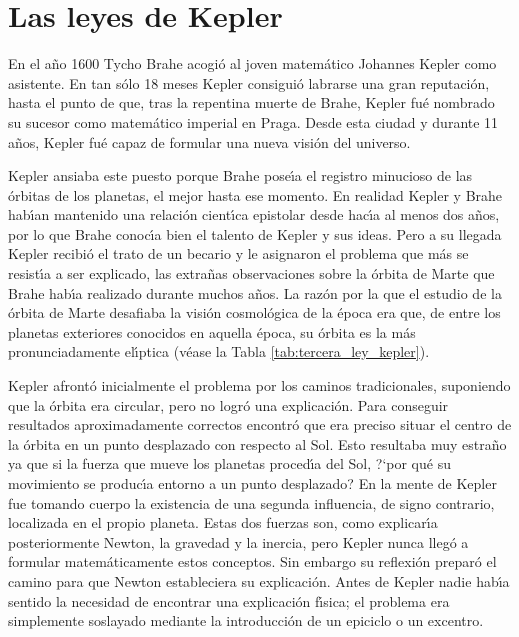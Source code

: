 \section{Las leyes de Kepler}

En el a\~{n}o 1600 Tycho Brahe acogi\'o al joven matem\'atico Johannes Kepler como asistente. En tan s\'olo 18 meses Kepler consigui\'o labrarse una gran reputaci\'on, hasta el punto de que, tras la repentina muerte de Brahe, Kepler fu\'e nombrado su sucesor como matem\'atico imperial en Praga. Desde esta ciudad y durante 11 a\~{n}os, Kepler fu\'e capaz de formular una nueva visi\'on del universo. 

Kepler ansiaba este puesto porque Brahe pose\'\i{}a el registro minucioso de las \'orbitas de los planetas, el mejor hasta ese momento. En realidad Kepler y Brahe hab\'\i{}an mantenido una relaci\'on cient\'\i{}ca epistolar desde hac\'\i{}a al menos dos a\~{n}os, por lo que Brahe conoc\'\i{}a bien el talento de Kepler y sus ideas. 
Pero a su llegada Kepler recibi\'o el trato de un becario y le asignaron el problema que m\'as se resist\'\i{}a a ser explicado, las extra\~{n}as observaciones sobre la \'orbita de Marte que Brahe hab\'\i{}a realizado durante muchos a\~{n}os. La raz\'on por la que el estudio de la \'orbita de Marte desafiaba la visi\'on cosmol\'ogica de la \'epoca era que, de entre los planetas exteriores conocidos en aquella \'epoca, su \'orbita es la m\'as pronunciadamente el\'\i{}ptica (v\'ease la Tabla \ref{tab:tercera_ley_kepler}).  

Kepler afront\'o inicialmente el problema por los caminos tradicionales, suponiendo que la \'orbita era circular, pero no logr\'o una explicaci\'on. Para conseguir resultados aproximadamente correctos encontr\'o que era preciso situar el centro de la \'orbita en un punto desplazado con respecto al Sol. Esto resultaba muy estra\~{n}o ya que si la fuerza que mueve los planetas proced\'\i{}a del Sol, ?`por qu\'e su movimiento se produc\'\i{}a entorno a un punto desplazado? En la mente de Kepler fue tomando cuerpo la existencia de una segunda influencia, de signo contrario, localizada en el propio planeta. Estas dos fuerzas son, como explicar\'\i{}a posteriormente Newton, la gravedad y la inercia, pero Kepler nunca lleg\'o a formular matem\'aticamente estos conceptos. Sin embargo su reflexi\'on prepar\'o el camino para que Newton estableciera su explicaci\'on. Antes de Kepler nadie hab\'\i{}a sentido la necesidad de encontrar una explicaci\'on f\'\i{}sica; el problema era simplemente soslayado mediante la introducci\'on de un epiciclo o un excentro. 

